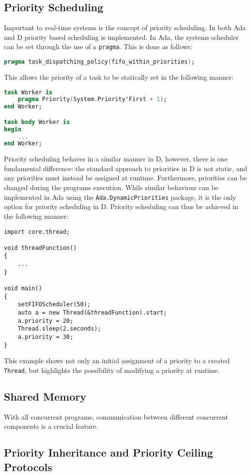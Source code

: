 \subsection{Priority Scheduling}
Important to real-time systems is the concept of priority scheduling. In both
Ada and D priority based scheduling is implemented. In Ada, the systems scheduler can
be set through the use of a \texttt{pragma}. This is done as follows: 
\begin{lstlisting}[language=Ada]
pragma task_dispatching_policy(fifo_within_priorities); 
\end{lstlisting}
This allows the priority of a task to be statically set in the following manner: 
\begin{lstlisting}[language=Ada]
task Worker is 
    pragma Priority(System.Priority'First + 1); 
end Worker;

task body Worker is 
begin 
    ...
end Worker; 
\end{lstlisting}
Priority scheduling behaves in a similar manner in D, however, there is one
fundamental difference: the standard approach to priorities in D is not static, 
and any priorities must instead be assigned at runtime. 
Furthermore, priorities can be changed during the programs execution. While similar
behaviour can be implemented in Ada using the
\texttt{Ada.Dynamic\textunderscore{}Priorities}
package, it is the only option for priority scheduling in D. 
Priority scheduling can thus be achieved in the following manner: 
\begin{lstlisting}
import core.thread; 

void threadFunction()
{
    ...
}

void main()
{
    setFIFOScheduler(50);
    auto a = new Thread(&threadFunction).start;
    a.priority = 20; 
    Thread.sleep(2.seconds); 
    a.priority = 30; 
}
\end{lstlisting}
This example shows not only an initial assignment of a priority to a created
\texttt{Thread}, but highlights the possibility of modifying a priority at
runtime. 

\subsection{Shared Memory}
With all concurrent programs, communication between different concurrent
components is a crucial feature. 


\subsection{Priority Inheritance and Priority Ceiling Protocols}

